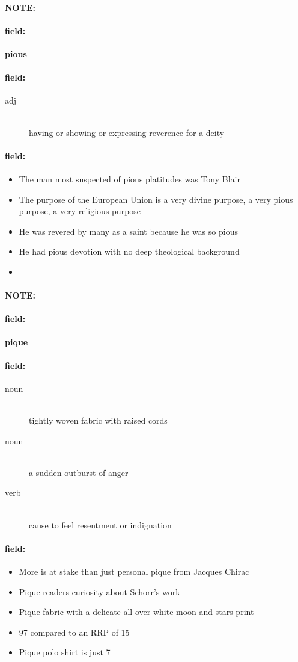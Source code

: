 \documentclass[12pt]{article}
\newenvironment{note}{\paragraph{NOTE:}}{}
\newenvironment{field}{\paragraph{field:}}{}
\begin{document}
\begin{note}
\begin{field}
\textbf{\large pious}
\end{field}


\begin{field}
\begin{description}
\item[adj] \hfill \\ 
having or showing or expressing reverence for a deity

\end{description}
\end{field}

\begin{field}
\begin{itemize}
\item The man most suspected of pious platitudes was Tony Blair
\item The purpose of the European Union is a very divine purpose, a very pious purpose, a very religious purpose
\item He was revered by many as a saint because he was so pious
\item He had pious devotion with no deep theological background
\item 
\end{itemize}
\end{field}
\end{note}
\begin{note}
\begin{field}
\textbf{\large pique}
\end{field}


\begin{field}
\begin{description}
\item[noun] \hfill \\ 
tightly woven fabric with raised cords

\item[noun] \hfill \\ 
a sudden outburst of anger

\item[verb] \hfill \\ 
cause to feel resentment or indignation

\end{description}
\end{field}

\begin{field}
\begin{itemize}
\item More is at stake than just personal pique from Jacques Chirac
\item Pique readers curiosity about Schorr's work
\item Pique fabric with a delicate all over white moon and stars print
\item 97 compared to an RRP of  15
\item Pique polo shirt is just  7
\end{itemize}
\end{field}
\end{note}
\end{document}
